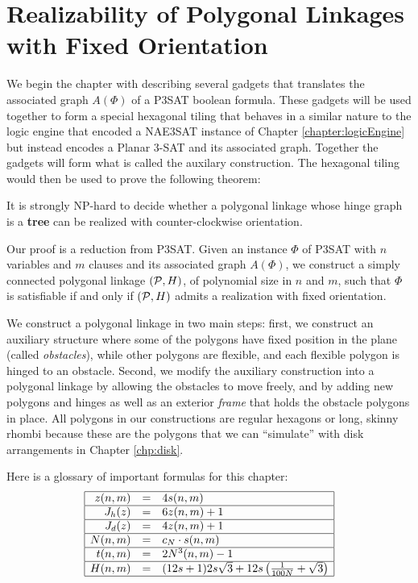 \chapter{Realizability of Polygonal Linkages with Fixed Orientation\label{chapter:polygonalLinkage}}

We begin the chapter with describing several gadgets that translates the associated graph $A(\Phi)$ of a P3SAT boolean formula.  
These gadgets will be used together to form a special hexagonal tiling that behaves in a similar nature to the logic engine that encoded a NAE3SAT instance of Chapter \ref{chapter:logicEngine} but instead encodes a Planar 3-SAT and its associated graph.
Together the gadgets will form what is called the auxilary construction.
The hexagonal tiling would then be used to prove the following theorem:
\begin{thm}\label{thm:hinge2}
It is strongly NP-hard to decide whether a polygonal linkage whose hinge graph is a \textbf{tree} can be realized with counter-clockwise orientation.
\end{thm}
Our proof is a reduction from P3SAT.
Given an instance $\Phi$ of P3SAT with $n$ variables and $m$ clauses and its associated graph $A(\Phi)$, we construct a simply connected polygonal linkage $({\cal P},H)$, of polynomial size in $n$ and $m$, such that $\Phi$ is satisfiable if and only if $({\cal P},H)$ admits a realization with fixed orientation. 

We construct a polygonal linkage in two main steps: first, we construct an auxiliary structure where some of the polygons have fixed position in the plane (called \emph{obstacles}), while other polygons are flexible, and each flexible polygon is hinged to an obstacle. 
Second, we modify the auxiliary construction into a polygonal linkage by allowing the obstacles to move freely, and by adding new polygons and hinges as well as an exterior \emph{frame} that holds the obstacle polygons in place.
All polygons in our constructions are regular hexagons or long, skinny rhombi because these are the polygons that we can ``simulate'' with disk arrangements in Chapter \ref{chp:disk}.

Here is a glossary of important formulas for this chapter:
$$
\begin{array}{|rcl|}
\hline
z(n,m)&=& 4 s(n,m)\\\hline
J_h (z) &=& 6z(n,m)+1\\\hline
J_d (z) &=& 4z(n,m)+1\\\hline
N(n,m)&=& c_N \cdot s(n,m)\\\hline
t(n,m)&=& 2 N^3(n,m)-1\\\hline
H(n,m) &=& (12s+1) 2 s\sqrt{3} + 12s \left( \frac{1}{100N} + \sqrt{3} \right)\\\hline
\end{array}
$$
